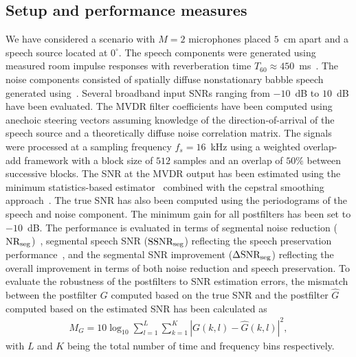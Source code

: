 \documentclass[10pt]{IEEEtran}
\begin{document}
\subsection{Setup and performance measures}
We have considered a scenario with $M= 2$ microphones placed $5$~cm apart and a speech source located at $0^\circ$. 
The speech components were generated using measured room impulse responses with reverberation time $T_{60} \approx 450$~ms~\cite{Wen_IWAENC_2006}.
The noise components consisted of spatially diffuse nonstationary babble speech generated using~\cite{Habets2008}.
Several broadband input SNRs ranging from $-10$~dB to $10$~dB have been evaluated.
The MVDR filter coefficients have been computed using anechoic steering vectors assuming knowledge of the direction-of-arrival of the speech source and a theoretically diffuse noise correlation matrix.
The signals were processed at a sampling frequency $f_s = 16$~kHz using a weighted overlap-add framework with a block size of $512$ samples and an overlap of $50\%$ between successive blocks. 
The SNR at the MVDR output has been estimated using the minimum statistics-based estimator~\cite{Martin_ITSAP_2001} combined with the cepstral smoothing approach~\cite{Breihaupt_ICASSP_2008}.
The true SNR has also been computed using the periodograms of the speech and noise component.
The minimum gain for all postfilters has been set to $-10$~dB. \newline
The performance is evaluated in terms of segmental noise reduction ($\text{NR}_{\rm seg}$)~\cite{Lotter_EURASIP_2005}, segmental speech SNR ($\text{SSNR}_{\rm seg}$) reflecting the speech preservation performance~\cite{Lotter_EURASIP_2005}, and the segmental SNR improvement ($\Delta \text{SNR}_{\rm seg}$) reflecting the overall improvement in terms of both noise reduction and speech preservation.
To evaluate the robustness of the postfilters to SNR estimation errors, the mismatch between the postfilter $G$ computed based on the true SNR and the postfilter $\hat{G}$ computed based on the estimated SNR has been calculated as
\begin{align*}
M_{G} = 10 \log_{10} \sum_{l = 1}^L \sum_{k = 1}^K |G(k,l) - \hat{G}(k,l)|^2,
\end{align*}
with $L$ and $K$ being the total number of time and frequency bins respectively. 
\end{document}
